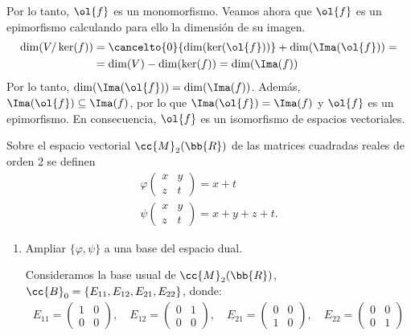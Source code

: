 \documentclass[12pt]{article}
\begin{document}
\begin{ejercicio}
\begin{enumerate}
		Por lo tanto, $\ol{f}$ es un monomorfismo. Veamos ahora que $\ol{f}$ es un epimorfismo calculando para ello la dimensión de su imagen.
		\begin{align*}
			\dim(V/\ker(f)) &= \cancelto{0}{\dim(\ker(\ol{f}))} + \dim(\Ima(\ol{f})) 
			=\\&= \dim(V)-\dim(\ker(f)) = \dim(\Ima(f))
		\end{align*}
		Por lo tanto, $\dim(\Ima(\ol{f})) = \dim(\Ima(f))$. Además, $\Ima(\ol{f}) \subseteq \Ima(f)$, por lo que $\Ima(\ol{f}) = \Ima(f)$ y $\ol{f}$ es un epimorfismo. En consecuencia, $\ol{f}$ es un isomorfismo de espacios vectoriales.
	\end{enumerate}
\end{ejercicio}

\begin{ejercicio}
	Sobre el espacio vectorial $\cc{M}_2(\bb{R})$ de las matrices cuadradas reales de orden 2 se definen
	\begin{gather*}
		\varphi\left(\begin{array}{cc}
			x & y \\
			z & t
		\end{array}\right) = x + t \\
		\psi\left(\begin{array}{cc}
			x & y \\
			z & t
		\end{array}\right) = x + y + z + t.
	\end{gather*}
	\begin{enumerate}
		\item Ampliar $\{\varphi, \psi\}$ a una base del espacio dual.
		
		Consideramos la base usual de $\cc{M}_2(\bb{R})$, $\cc{B}_0 = \{E_{11}, E_{12}, E_{21}, E_{22}\}$, donde:
		\begin{gather*}
			E_{11} = \left(\begin{array}{cc}
				1 & 0 \\
				0 & 0
			\end{array}\right), \quad
			E_{12} = \left(\begin{array}{cc}
				0 & 1 \\
				0 & 0
			\end{array}\right), \quad
			E_{21} = \left(\begin{array}{cc}
				0 & 0 \\
				1 & 0
			\end{array}\right), \quad
			E_{22} = \left(\begin{array}{cc}
				0 & 0 \\
				0 & 1
			\end{array}\right)
		\end{gather*}


\end{enumerate}
\end{ejercicio}
\end{document}
